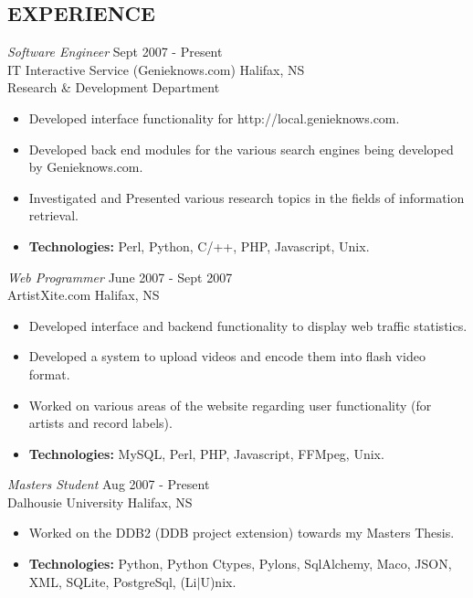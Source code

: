 \documentclass[line,margin]{res}
\begin{document}
\begin{resume}
\section{EXPERIENCE} 
   {\sl Software Engineer} \hfill Sept 2007 - Present \\
    IT Interactive Service (Genieknows.com) \hfill Halifax, NS \\
    Research {\&} Development Department \smallskip
    \begin{itemize}  \itemsep -2pt %
     \item Developed interface functionality for
             http://local.genieknows.com.
     \item Developed back end modules for the various search
             engines being developed by Genieknows.com.
     \item Investigated and Presented various research topics
             in the fields of information retrieval.
     \item {\bf Technologies:} \hspace{1pt} 
        Perl, Python, C/++, PHP, Javascript, Unix.
    \end{itemize}

   {\sl Web Programmer} \hfill June 2007 - Sept 2007 \\
    ArtistXite.com \hfill Halifax, NS \smallskip
    \begin{itemize}  \itemsep -2pt %
     \item Developed interface and backend functionality to display 
               web traffic statistics.
     \item Developed a system to upload videos and encode them
                into flash video format.
     \item Worked on various areas of the website regarding user 
               functionality (for artists and record labels).
     \item {\bf Technologies:}\hspace{4pt} 
        MySQL, Perl, PHP, Javascript, FFMpeg, Unix.
    \end{itemize}

   {\sl Masters Student} \hfill Aug 2007 - Present \\
     Dalhousie University \hfill Halifax, NS \smallskip
      \begin{itemize}  \itemsep -2pt %
       \item Worked on the DDB2 (DDB project extension)
       towards my Masters Thesis.
       \item {\bf Technologies:} \hspace{1pt} 
        Python, Python Ctypes, Pylons, SqlAlchemy, Maco, JSON, \newline 
        \hspace*{72pt} XML, SQLite, PostgreSql, 
        (Li$|$U)nix.
    \end{itemize} 


\end{resume}
\end{document}
